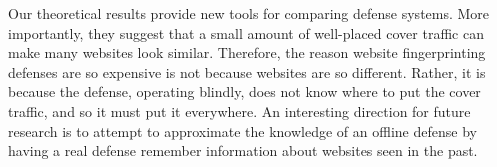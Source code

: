 \documentclass[10pt,journal]{IEEEtran}
\begin{document}
Our theoretical results provide new tools for comparing defense
systems.  More importantly, they suggest that a small amount of
well-placed cover traffic can make many websites look similar.
Therefore, the reason website fingerprinting defenses are so expensive
is not because websites are so different.  Rather, it is because the
defense, operating blindly, does not know where to put the cover
traffic, and so it must put it everywhere.  An interesting direction
for future research is to attempt to approximate the knowledge of an
offline defense by having a real defense remember information about
websites seen in the past.






\end{document}
